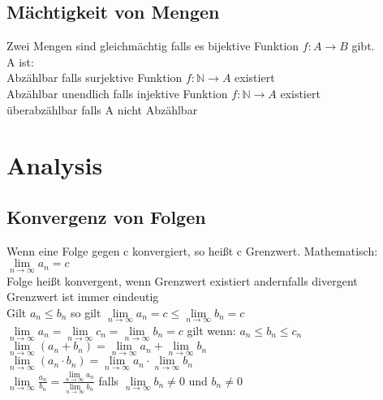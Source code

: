 \documentclass[a4paper]{scrartcl}
\begin{document}
\subsection{Mächtigkeit von Mengen}
Zwei Mengen sind gleichmächtig falls es bijektive Funktion $f:A\to B$ gibt.\\
A ist:\\
Abzählbar falls surjektive Funktion $f: \mathbb{N} \to A$ existiert\\
Abzählbar unendlich falls injektive Funktion $f: \mathbb{N} \to A$ existiert\\
überabzählbar falls A nicht Abzählbar\\

\section{Analysis}
\subsection{Konvergenz von Folgen}
Wenn eine Folge gegen c konvergiert, so heißt c Grenzwert. Mathematisch: $\lim\limits_{n\to \infty} a_n = c$\\
Folge heißt konvergent, wenn Grenzwert existiert andernfalls divergent\\
Grenzwert ist immer eindeutig\\
Gilt $a_n \leq b_n$ so gilt $\lim\limits_{n\to \infty} a_n = c \leq \lim\limits_{n\to \infty} b_n = c$\\
$\lim\limits_{n\to \infty} a_n = \lim\limits_{n\to \infty} c_n = \lim\limits_{n\to \infty} b_n = c$ gilt wenn: $a_n \leq b_n \leq c_n$\\
$\lim\limits_{n\to \infty} (a_n + b_n) = \lim\limits_{n\to \infty} a_n + \lim\limits_{n\to \infty} b_n$\\
$\lim\limits_{n\to \infty} (a_n \cdot b_n) = \lim\limits_{n\to \infty} a_n \cdot \lim\limits_{n\to \infty} b_n$\\
$\lim\limits_{n\to \infty} \frac{a_n}{b_n} = \frac{\lim\limits_{n\to \infty} a_n}{\lim\limits_{n\to \infty} b_n}$ falls $\lim\limits_{n\to \infty} b_n \neq 0$ und $b_n \neq 0$\\
\end{document}
